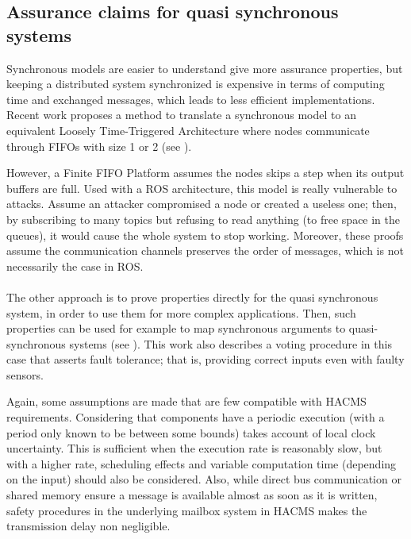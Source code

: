 \subsection{Assurance claims for quasi synchronous systems}

Synchronous models are easier to understand give more assurance properties, but keeping a distributed system synchronized is expensive in terms of computing time and exchanged messages, which leads to less efficient implementations.
Recent work proposes a method to translate a synchronous model to an equivalent Loosely Time-Triggered Architecture where nodes communicate through FIFOs with size 1 or 2 (see \cite{LTTA}).

However, a Finite FIFO Platform assumes the nodes skips a step when its output buffers are full. Used with a ROS architecture, this model is really vulnerable to attacks.
Assume an attacker compromised a node or created a useless one; then, by subscribing to many topics but refusing to read anything (to free space in the queues), it would cause the whole system to stop working.
Moreover, these proofs assume the communication channels preserves the order of messages, which is not necessarily the case in ROS.

\paragraph{ } The other approach is to prove properties directly for the quasi synchronous system, in order to use them for more complex applications. 
Then, such properties can be used for example to map synchronous arguments to quasi-synchronous systems (see \cite{Caspi}).
This work also describes a voting procedure in this case that asserts fault tolerance; that is, providing correct inputs even with faulty sensors.

Again, some assumptions are made that are few compatible with HACMS requirements. Considering that components have a periodic execution (with a period only known to be between some bounds) takes account of local clock uncertainty.
This is sufficient when the execution rate is reasonably slow, but with a higher rate, scheduling effects and variable computation time (depending on the input) should also be considered.
Also, while direct bus communication or shared memory ensure a message is available almost as soon as it is written, safety procedures in the underlying mailbox system in HACMS makes the transmission delay non negligible.



